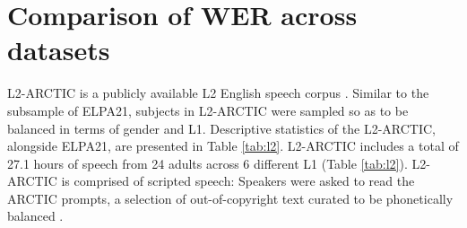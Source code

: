 \documentclass [PhD] {uclathes}
\begin{document}
\section{Comparison of WER across datasets}
\label{sec:appendix_l2}

L2-ARCTIC is a publicly available L2 English speech corpus \citep{zhao2018l2}. Similar to the subsample of ELPA21, subjects in L2-ARCTIC were sampled so as to be balanced in terms of gender and L1. Descriptive statistics of the L2-ARCTIC, alongside ELPA21, are presented in Table \ref{tab:l2}. L2-ARCTIC includes a total of 27.1 hours of speech from 24 adults across 6 different L1 (Table \ref{tab:l2}). L2-ARCTIC is comprised of scripted speech: Speakers were asked to read the ARCTIC prompts, a selection of out-of-copyright text curated to be phonetically balanced \citep{kominek2003}. 
\end{document}
